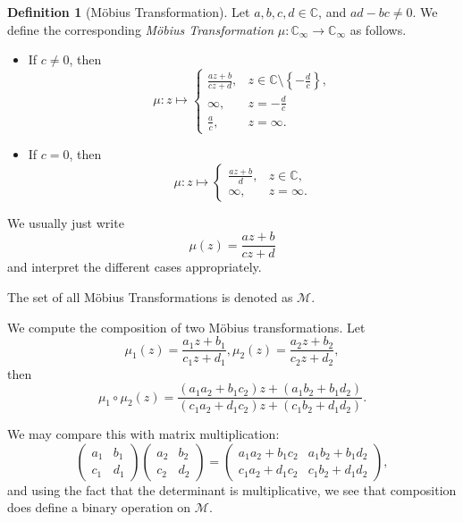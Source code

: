 \documentclass{article}
\theoremstyle{definition}
\newtheorem{definition}[theorem]{Definition}
\theoremstyle{remark}
\newcommand{\pqty}[1]{\left(#1\right)}
\newcommand{\Bqty}[1]{\left\{#1\right\}}
\newcommand{\functiondomain}[3]{#1:#2\to #3}
\newcommand{\functionmap}[3]{#1:#2\mapsto #3}
\newcommand{\pmqty}[1]{\begin{pmatrix}#1\end{pmatrix}}
\newcommand{\CC}{\mathbb{C}}
\newcommand{\compactify}{_{\infty}}
\newcommand{\mobius}{\mathcal{M}}
\begin{document}
\begin{definition}[M\"{o}bius Transformation]
    \label{def:mobius-transformation}%
    Let \(a, b, c, d \in \CC\), and \(ad - bc \neq 0\). We define the corresponding \emph{M\"{o}bius Transformation} \(\functiondomain{\mu}{\CC\compactify}{\CC\compactify}\) as follows.

    \begin{itemize}
        \item If \(c \neq 0\), then
        \[
            \functionmap{\mu}{z}{\begin{cases}
                \frac{az + b}{cz + d}, & z \in \CC \setminus \Bqty{-\frac{d}{c}}, \\
                \infty, & z = - \frac{d}{c} \\
                \frac{a}{c}, & z = \infty.
            \end{cases}}
        \]
        \item If \(c = 0 \), then
        \[
            \functionmap{\mu}{z}{\begin{cases}
                \frac{az + b}{d}, & z \in \CC,\\
                \infty, & z = \infty.
            \end{cases}}
        \]
    \end{itemize}

    We usually just write
    \[
        \mu\pqty{z} = \frac{az + b}{cz + d}
    \]
    and interpret the different cases appropriately.

    The set of all M\"{o}bius Transformations is denoted as \(\mobius\).
\end{definition}

We compute the composition of two M\"{o}bius transformations. Let
\[
    \mu_{1} \pqty{z} = \frac{a_1 z + b_1}{c_1 z + d_1}, \mu_{2} \pqty{z} = \frac{a_2 z + b_2}{c_2 z + d_2},
\]
then
\[
    \mu_{1} \circ \mu_{2} \pqty{z} = \frac{\pqty{a_1 a_2 + b_1 c_2} z + \pqty{a_1 b_2 + b_1 d_2}}{\pqty{c_1 a_2 + d_1 c_2} z + \pqty{c_1 b_2 + d_1 d_2}}.
\]

We may compare this with matrix multiplication:
\[
    \pmqty{a_1 & b_1 \\ c_1 & d_1}
    \pmqty{a_2 & b_2 \\ c_2 & d_2}
    =
    \pmqty{a_1 a_2 + b_1 c_2 & a_1 b_2 + b_1 d_2 \\
        c_1 a_2 + d_1 c_2 & c_1 b_2 + d_1 d_2},
\]
and using the fact that the determinant is multiplicative, we see that composition does define a binary operation on \(\mobius\).
\end{document}
